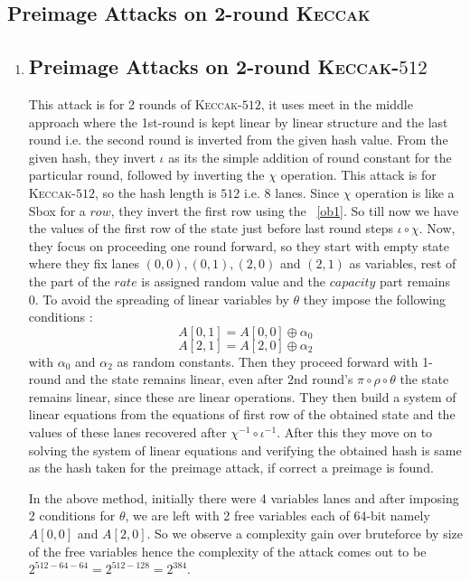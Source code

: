 \documentclass[runningheads]{llncs}
\newcommand{\KECCAK}{\mbox{\textsc{Keccak}}}
\begin{document}
\subsection{Preimage Attacks on 2-round \KECCAK}
\begin{enumerate}
	\item \subsection{Preimage Attacks on 2-round \KECCAK-$512$}
		This attack is for 2 rounds of \KECCAK-$512$, it uses meet in the middle approach where the 1st-round is kept linear by linear structure and the last round i.e. the second round is inverted from the given hash value. From the given hash, they invert $\iota$ as its the simple addition of round constant for the particular round, followed by inverting the $\chi$ operation. This attack is for \KECCAK-$512$, so the hash length is $512$ i.e. $8$ lanes. Since $\chi$ operation is like a Sbox for a $row$, they invert the first row using the ~\ref{ob1}. So till now we have the values of the first row of the state just before last round steps $\iota \circ \chi$. Now, they focus on proceeding one round forward, so they start with empty state where they fix lanes $(0,0), (0,1), (2,0) $ and $(2,1)$ as variables, rest of the part of the $rate$ is assigned random value and the $capacity$ part remains 0. To avoid the spreading of linear variables by $\theta$ they impose the following conditions : 
		\[
			A[0, 1] = A[0, 0] \oplus \alpha_{0}
		\]
		\[
			A[2, 1] = A[2, 0] \oplus \alpha_{2}
		\]
		with $\alpha_0$ and $\alpha_2$ as random constants.
		Then they proceed forward with 1-round and the state remains linear, even after 2nd round's $\pi \circ \rho \circ \theta$ the state remains linear, since these are linear operations. They then build a system of linear equations from the equations of first row of the obtained state and the values of these lanes recovered after $\chi^{-1} \circ \iota^{-1}$. After this they move on to solving the system of linear equations and verifying the obtained hash is same as the hash taken for the preimage attack, if correct a preimage is found.
		
		In the above method, initially there were 4 variables lanes and after imposing 2 conditions for $\theta$, we are left with 2 free variables each of 64-bit namely $A[0,0]$ and $A[2, 0]$. So we observe a complexity gain over bruteforce by size of the free variables hence the complexity of the attack comes out to be $2^{512 - 64 - 64} = 2^{512 - 128} = 2^{384}$.


\end{enumerate}
\end{document}
